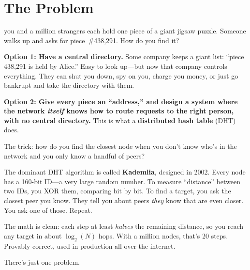 \documentclass[nobib]{tufte-handout}
\begin{document}
\section{The Problem}

 you and a million strangers each hold one piece of a giant jigsaw puzzle. Someone walks up and asks for piece~\#438{,}291. How do you find it?

\textbf{Option 1: Have a central directory.} Some company keeps a giant list: ``piece 438{,}291 is held by Alice.'' Easy to look up---but now that company controls everything. They can shut you down, spy on you, charge you money, or just go bankrupt and take the directory with them.

\textbf{Option 2: Give every piece an ``address,'' and design a system where the network \emph{itself} knows how to route requests to the right person, with no central directory.} This is what a \textbf{distributed hash table} (DHT) does.

The trick: how do you find the closest node when you don't know who's in the network and you only know a handful of peers?

The dominant DHT algorithm is called \textbf{Kademlia}, designed in 2002. Every node has a 160-bit ID---a very large random number. To measure ``distance'' between two IDs, you XOR them, comparing bit by bit. To find a target, you ask the closest peer you know. They tell you about peers \emph{they} know that are even closer. You ask one of those. Repeat.

The math is clean: each step at least \emph{halves} the remaining distance, so you reach any target in about $\log_2(N)$ hops. With a million nodes, that's 20 steps. Provably correct, used in production all over the internet.

There's just one problem.

\end{document}
